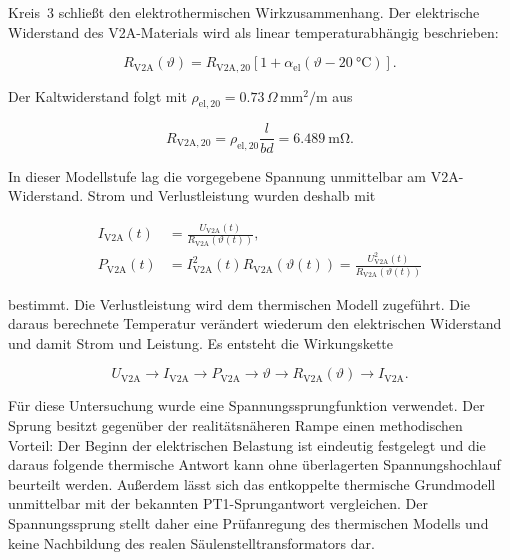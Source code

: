 Kreis~3 schließt den elektrothermischen Wirkzusammenhang. Der elektrische
Widerstand des V2A-Materials wird als linear temperaturabhängig beschrieben:

\begin{equation}
    R_\mathrm{V2A}(\vartheta)
    =
    R_{\mathrm{V2A},20}
    \left[
        1+\alpha_\mathrm{el}
        \left(\vartheta-\SI{20}{\degreeCelsius}\right)
    \right].
    \label{eq:kap5_rv2a_temperatur}
\end{equation}

Der Kaltwiderstand folgt mit
\(\rho_{\mathrm{el},20}=0.73\,\Omega\,\mathrm{mm^2/m}\) aus

\begin{equation}
    R_{\mathrm{V2A},20}
    =
    \rho_{\mathrm{el},20}\frac{l}{bd}
    =
    \SI{6.489}{\milli\ohm}.
    \label{eq:kap5_rv2a_20}
\end{equation}

In dieser Modellstufe lag die vorgegebene Spannung unmittelbar am
V2A-Widerstand. Strom und Verlustleistung wurden deshalb mit

\begin{align}
    I_\mathrm{V2A}(t)
    &=
    \frac{U_\mathrm{V2A}(t)}{R_\mathrm{V2A}(\vartheta(t))},
    \\
    P_\mathrm{V2A}(t)
    &=
    I_\mathrm{V2A}^{2}(t)R_\mathrm{V2A}(\vartheta(t))
    =
    \frac{U_\mathrm{V2A}^{2}(t)}{R_\mathrm{V2A}(\vartheta(t))}
    \label{eq:kap5_kreis3_elektrisch}
\end{align}

bestimmt. Die Verlustleistung wird dem thermischen Modell zugeführt. Die
daraus berechnete Temperatur verändert wiederum den elektrischen Widerstand
und damit Strom und Leistung. Es entsteht die Wirkungskette

\begin{equation}
    U_\mathrm{V2A}
    \longrightarrow
    I_\mathrm{V2A}
    \longrightarrow
    P_\mathrm{V2A}
    \longrightarrow
    \vartheta
    \longrightarrow
    R_\mathrm{V2A}(\vartheta)
    \longrightarrow
    I_\mathrm{V2A}.
    \label{eq:kap5_kreis3_wirkungskette}
\end{equation}

Für diese Untersuchung wurde eine Spannungssprungfunktion verwendet. Der
Sprung besitzt gegenüber der realitätsnäheren Rampe einen methodischen
Vorteil: Der Beginn der elektrischen Belastung ist eindeutig festgelegt und
die daraus folgende thermische Antwort kann ohne überlagerten
Spannungshochlauf beurteilt werden. Außerdem lässt sich das entkoppelte
thermische Grundmodell unmittelbar mit der bekannten PT1-Sprungantwort
vergleichen. Der Spannungssprung stellt daher eine Prüfanregung des
thermischen Modells und keine Nachbildung des realen
Säulenstelltransformators dar.

